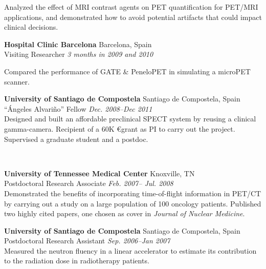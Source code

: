 \documentclass[letterpaper]{article}
\begin{document}
\begin{description}
Analyzed the effect of MRI contrast agents on PET quantification for PET/MRI
applications, and demonstrated how to avoid potential artifacts that could impact clinical decisions.

\item[]
    \textbf{Hospital Clinic Barcelona} \hfill Barcelona, Spain 
\\
Visiting Researcher \hfill  \textit{3 months in 2009 and 2010} 

Compared the performance of GATE \& PeneloPET in simulating a microPET
scanner.

\item[]
    \textbf{University of Santiago de Compostela} \hfill Santiago de
    Compostela, Spain
\\
    ``\'Angeles Alvari\~no'' Fellow \hfill \textit{Dec. 2008--Dec 2011}
\vspace*{0.5ex}
    \\
    Designed and built an affordable preclinical SPECT system by reusing a
    clinical gamma-camera. Recipient of a 60K \euro grant as PI to carry out
    the project. Supervised a graduate student and a postdoc.

\\

\item[]
    \textbf{University of Tennessee Medical Center} \hfill Knoxville, TN
\\
Postdoctoral Research Associate \hfill \textit{Feb. 2007-- Jul. 2008} 
\vspace*{0.5ex}
\\
Demonstrated the benefits of incorporating time-of-flight information in PET/CT
by carrying out a study on a large population of 100 oncology patients. Published
two highly cited papers, one chosen as cover in \textit{Journal of Nuclear Medicine}.

\item[]
    \textbf{University of Santiago de Compostela} \hfill Santiago de
    Compostela, Spain
\\
    Postdoctoral Research Assistant \hfill \textit{Sep. 2006--Jan 2007}
\vspace*{0.5ex}
    \\
    Measured the neutron fluency in a linear accelerator to estimate its
    contribution to the radiation dose in radiotherapy patients.


\end{description}
\end{document}
